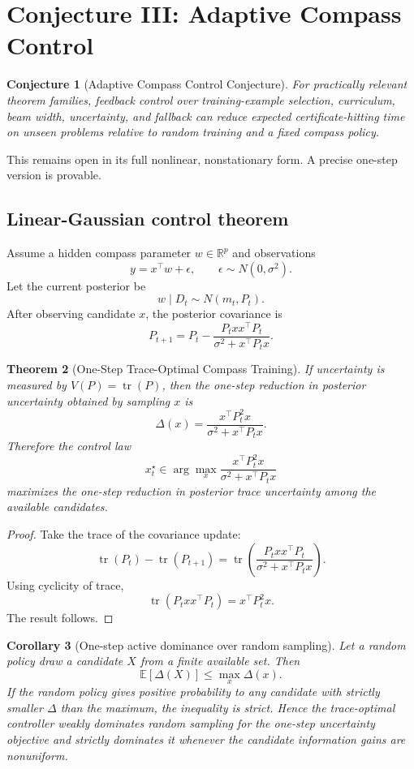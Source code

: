 \documentclass[11pt]{article}
\newtheorem{theorem}{Theorem}[section]
\newtheorem{corollary}[theorem]{Corollary}
\newtheorem{conjecture}[theorem]{Conjecture}
\newcommand{\E}{\mathbb{E}}
\begin{document}
\section{Conjecture III: Adaptive Compass Control}

\begin{conjecture}[Adaptive Compass Control Conjecture]
For practically relevant theorem families, feedback control over training-example selection, curriculum, beam width, uncertainty, and fallback can reduce expected certificate-hitting time on unseen problems relative to random training and a fixed compass policy.
\end{conjecture}

This remains open in its full nonlinear, nonstationary form. A precise one-step version is provable.

\subsection{Linear-Gaussian control theorem}

Assume a hidden compass parameter \(w\in\mathbb{R}^p\) and observations
\[
y=x^\top w+\epsilon,\qquad \epsilon\sim N(0,\sigma^2).
\]
Let the current posterior be
\[
w\mid D_t\sim N(m_t,P_t).
\]
After observing candidate \(x\), the posterior covariance is
\[
P_{t+1}
=
P_t-
\frac{P_txx^\top P_t}{\sigma^2+x^\top P_tx}.
\]

\begin{theorem}[One-Step Trace-Optimal Compass Training]
If uncertainty is measured by \(V(P)=\operatorname{tr}(P)\), then the one-step reduction in posterior uncertainty obtained by sampling \(x\) is
\[
\Delta(x)
=
\frac{x^\top P_t^2x}{\sigma^2+x^\top P_tx}.
\]
Therefore the control law
\[
x_t^\star
\in
\arg\max_x
\frac{x^\top P_t^2x}{\sigma^2+x^\top P_tx}
\]
maximizes the one-step reduction in posterior trace uncertainty among the available candidates.
\end{theorem}

\begin{proof}
Take the trace of the covariance update:
\[
\operatorname{tr}(P_t)-\operatorname{tr}(P_{t+1})
=
\operatorname{tr}\left(
\frac{P_txx^\top P_t}{\sigma^2+x^\top P_tx}
\right).
\]
Using cyclicity of trace,
\[
\operatorname{tr}(P_txx^\top P_t)=x^\top P_t^2x.
\]
The result follows.
\end{proof}

\begin{corollary}[One-step active dominance over random sampling]
Let a random policy draw a candidate \(X\) from a finite available set. Then
\[
\E[\Delta(X)]\le \max_x\Delta(x).
\]
If the random policy gives positive probability to any candidate with strictly smaller \(\Delta\) than the maximum, the inequality is strict. Hence the trace-optimal controller weakly dominates random sampling for the one-step uncertainty objective and strictly dominates it whenever the candidate information gains are nonuniform.
\end{corollary}
\end{document}
